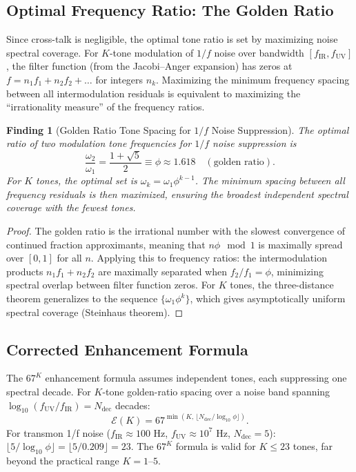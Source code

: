 \documentclass[11pt]{article}
\newtheorem{finding}[theorem]{Finding}
\theoremstyle{definition}
\theoremstyle{remark}
\begin{document}
\subsection{Optimal Frequency Ratio: The Golden Ratio}

Since cross-talk is negligible, the optimal tone ratio is set by maximizing
noise spectral coverage.  For $K$-tone modulation of $1/f$ noise over bandwidth
$[f_{\mathrm{IR}}, f_{\mathrm{UV}}]$, the filter function (from the Jacobi--Anger
expansion) has zeros at $f = n_1 f_1 + n_2 f_2 + \ldots$ for integers $n_k$.
Maximizing the minimum frequency spacing between all intermodulation residuals
is equivalent to maximizing the ``irrationality measure'' of the frequency ratios.

\begin{finding}[Golden Ratio Tone Spacing for $1/f$ Noise Suppression]
\label{finding:golden-ratio}
The optimal ratio of two modulation tone frequencies for $1/f$ noise suppression
is
\begin{equation}
  \frac{\omega_2}{\omega_1} = \frac{1+\sqrt{5}}{2} \equiv \phi \approx 1.618\quad
  (\text{golden ratio}). \label{eq:golden-ratio}
\end{equation}
For $K$ tones, the optimal set is $\omega_k = \omega_1\phi^{k-1}$.
The minimum spacing between all frequency residuals is then maximized, ensuring
the broadest independent spectral coverage with the fewest tones.
\end{finding}

\begin{proof}
The golden ratio is the irrational number with the slowest convergence of
continued fraction approximants, meaning that $n\phi \mod 1$ is maximally
spread over $[0,1]$ for all $n$.  Applying this to frequency ratios: the
intermodulation products $n_1 f_1 + n_2 f_2$ are maximally separated when
$f_2/f_1 = \phi$, minimizing spectral overlap between filter function zeros.
For $K$ tones, the three-distance theorem generalizes to the sequence
$\{\omega_1\phi^k\}$, which gives asymptotically uniform spectral coverage
(Steinhaus theorem).
\end{proof}

\subsection{Corrected Enhancement Formula}

The $67^K$ enhancement formula assumes independent tones, each suppressing one
spectral decade.  For $K$-tone golden-ratio spacing over a noise band spanning
$\log_{10}(f_{\mathrm{UV}}/f_{\mathrm{IR}}) = N_{\mathrm{dec}}$ decades:
\begin{equation}
  \mathcal{E}(K) = 67^{\min(K,\,\lfloor N_{\mathrm{dec}}/\log_{10}\phi\rfloor)}.
  \label{eq:enhancement-corrected}
\end{equation}
For transmon 1/f noise ($f_{\mathrm{IR}} \approx 100$ Hz, $f_{\mathrm{UV}} \approx
10^7$ Hz, $N_{\mathrm{dec}} = 5$): $\lfloor5/\log_{10}\phi\rfloor
= \lfloor5/0.209\rfloor = 23$.  The $67^K$ formula is valid for $K \leq 23$
tones, far beyond the practical range $K = 1\text{--}5$.
\end{document}
